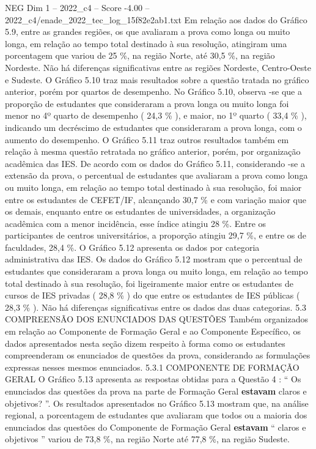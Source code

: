 \begin{textsample}{NEG Dim 1 – 2022\_c4 – Score -4.00 – 2022\_c4/enade\_2022\_tec\_log\_15f82e2ab1.txt}
Em relação aos dados do Gráfico 5.9, entre as grandes regiões, os que avaliaram a prova como longa ou muito longa, em relação ao tempo total destinado à sua resolução, atingiram uma porcentagem que variou de 25 \%, na região Norte, até 30,5 \%, na região Nordeste.
Não há diferenças significativas entre as regiões Nordeste, Centro-Oeste e Sudeste.
O Gráfico 5.10 traz mais resultados sobre a questão tratada no gráfico anterior, porém por quartos de desempenho.
No Gráfico 5.10, observa -se que a proporção de estudantes que consideraram a prova longa ou muito longa foi menor no 4º quarto de desempenho ( 24,3 \% ), e maior, no 1º quarto ( 33,4 \% ), indicando um decréscimo de estudantes que consideraram a prova longa, com o aumento do desempenho.
O Gráfico 5.11 traz outros resultados também em relação à mesma questão retratada no gráfico anterior, porém, por organização acadêmica das IES.
De acordo com os dados do Gráfico 5.11, considerando -se a extensão da prova, o percentual de estudantes que avaliaram a prova como longa ou muito longa, em relação ao tempo total destinado à sua resolução, foi maior entre os estudantes de CEFET/IF, alcançando 30,7 \% e com variação maior que os demais, enquanto entre os estudantes de universidades, a organização acadêmica com a menor incidência, esse índice atingiu 28 \%.
Entre os participantes de centros universitários, a proporção atingiu 29,7 \%, e entre os de faculdades, 28,4 \%.
O Gráfico 5.12 apresenta os dados por categoria administrativa das IES.
Os dados do Gráfico 5.12 mostram que o percentual de estudantes que consideraram a prova longa ou muito longa, em relação ao tempo total destinado à sua resolução, foi ligeiramente maior entre os estudantes de cursos de IES privadas ( 28,8 \% ) do que entre os estudantes de IES públicas ( 28,3 \% ).
Não há diferenças significativas entre os dados das duas categorias. 5.3 COMPREENSÃO DOS ENUNCIADOS DAS QUESTÕES Também organizados em relação ao Componente de Formação Geral e ao Componente Específico, os dados apresentados nesta seção dizem respeito à forma como os estudantes compreenderam os enunciados de questões da prova, considerando as formulações expressas nesses mesmos enunciados. 5.3.1 COMPONENTE DE FORMAÇÃO GERAL O Gráfico 5.13 apresenta as respostas obtidas para a Questão 4 : “ Os enunciados das questões da prova na parte de Formação Geral \textbf{estavam} claros e objetivos? ”.
Os resultados apresentados no Gráfico 5.13 mostram que, na análise regional, a porcentagem de estudantes que avaliaram que todos ou a maioria dos enunciados das questões do Componente de Formação Geral \textbf{estavam} “ claros e objetivos ” variou de 73,8 \%, na região Norte até 77,8 \%, na região Sudeste.

\end{textsample}
